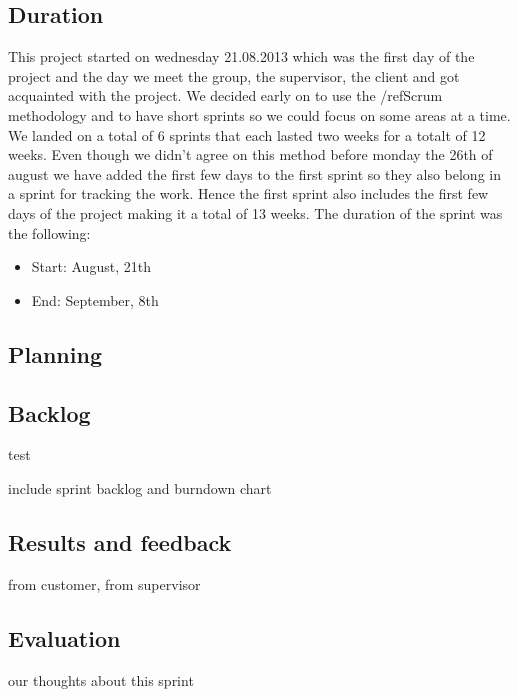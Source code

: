 \subsection{Duration}
This project started on wednesday 21.08.2013 which was the first day of the project and the day we meet the group, the supervisor, the client and got acquainted with the project. We decided early on to use the /ref{Scrum} methodology and to have short sprints so we could focus on some areas at a time. We landed on a total of 6 sprints that each lasted two weeks for a totalt of 12 weeks. Even though we didn't agree on this method before monday the 26th of august we have added the first few days to the first sprint so they also belong in a sprint for tracking the work. Hence the first sprint also includes the first few days of the project making it a total of 13 weeks. 
The duration of the sprint was the following:
\begin{itemize}
\item Start: August, 21th
\item End: September, 8th
\end{itemize}

\subsection{Planning} 

\subsection{Backlog}

\begin{description}
\item[test]
\end{description}


include sprint backlog and burndown chart
\subsection{Results and feedback}
from customer, from supervisor
\subsection{Evaluation}
our thoughts about this sprint